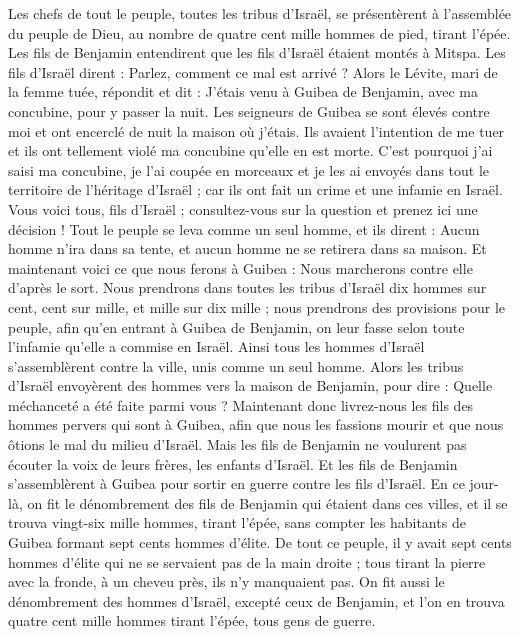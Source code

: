 \begin{multicols}{2}
Les chefs de tout le peuple, toutes les tribus d'Israël, se présentèrent à l'assemblée du peuple de Dieu, au nombre de quatre cent mille hommes de pied, tirant l'épée.
Les fils de Benjamin entendirent que les fils d'Israël étaient montés à Mitspa. Les fils d'Israël dirent : Parlez, comment ce mal est arrivé ?
Alors le Lévite, mari de la femme tuée, répondit et dit : J'étais venu à Guibea de Benjamin, avec ma concubine, pour y passer la nuit.
Les seigneurs de Guibea se sont élevés contre moi et ont encerclé de nuit la maison où j'étais. Ils avaient l'intention de me tuer et ils ont tellement violé ma concubine qu'elle en est morte.
C'est pourquoi j'ai saisi ma concubine, je l'ai coupée en morceaux et je les ai envoyés dans tout le territoire de l'héritage d'Israël ; car ils ont fait un crime et une infamie en Israël.
Vous voici tous, fils d'Israël ; consultez-vous sur la question et prenez ici une décision !
Tout le peuple se leva comme un seul homme, et ils dirent : Aucun homme n'ira dans sa tente, et aucun homme ne se retirera dans sa maison.
Et maintenant voici ce que nous ferons à Guibea : Nous marcherons contre elle d'après le sort.
Nous prendrons dans toutes les tribus d'Israël dix hommes sur cent, cent sur mille, et mille sur dix mille ; nous prendrons des provisions pour le peuple, afin qu'en entrant à Guibea de Benjamin, on leur fasse selon toute l'infamie qu'elle a commise en Israël.
Ainsi tous les hommes d'Israël s'assemblèrent contre la ville, unis comme un seul homme.
Alors les tribus d'Israël envoyèrent des hommes vers la maison de Benjamin, pour dire : Quelle méchanceté a été faite parmi vous ?
Maintenant donc livrez-nous les fils des hommes pervers qui sont à Guibea, afin que nous les fassions mourir et que nous ôtions le mal du milieu d'Israël. Mais les fils de Benjamin ne voulurent pas écouter la voix de leurs frères, les enfants d'Israël.
Et les fils de Benjamin s'assemblèrent à Guibea pour sortir en guerre contre les fils d'Israël.
En ce jour-là, on fit le dénombrement des fils de Benjamin qui étaient dans ces villes, et il se trouva vingt-six mille hommes, tirant l'épée, sans compter les habitants de Guibea formant sept cents hommes d'élite.
De tout ce peuple, il y avait sept cents hommes d'élite qui ne se servaient pas de la main droite ; tous tirant la pierre avec la fronde, à un cheveu près, ils n'y manquaient pas.
On fit aussi le dénombrement des hommes d'Israël, excepté ceux de Benjamin, et l'on en trouva quatre cent mille hommes tirant l'épée, tous gens de guerre.

\end{multicols}

